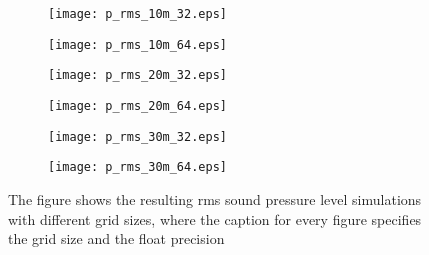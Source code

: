 \begin{figure}[H]
\begin{subfigure}[c]{0.46\textwidth}
\texttt{[image: p\_rms\_10m\_32.eps]}
\label{fig:p_rms_10m_32}
\vspace{5mm}
\end{subfigure}
\hfill
\begin{subfigure}[c]{0.46\textwidth}
\texttt{[image: p\_rms\_10m\_64.eps]}
\label{fig:p_rms_10m_64}
\vspace{5mm}
\end{subfigure}
\begin{subfigure}[c]{0.46\textwidth}
\texttt{[image: p\_rms\_20m\_32.eps]}
\label{fig:p_rms_20m_32}
\vspace{5mm}
\end{subfigure}
\hfill
\begin{subfigure}[c]{0.46\textwidth}
\texttt{[image: p\_rms\_20m\_64.eps]}
\label{fig:p_rms_20m_64}
\vspace{5mm}
\end{subfigure}
\begin{subfigure}[c]{0.46\textwidth}
\texttt{[image: p\_rms\_30m\_32.eps]}
\label{fig:p_rms_30m_32}
\vspace{5mm}
\end{subfigure}
\hfill
\begin{subfigure}[c]{0.46\textwidth}
\texttt{[image: p\_rms\_30m\_64.eps]}
\label{fig:p_rms_30m_64}
\vspace{5mm}
\end{subfigure}
\caption{The figure shows the resulting \gls{rms} sound pressure level simulations with different grid sizes, where the caption for every figure specifies the grid size and the float precision}
		\label{fig:p_rms}
\end{figure}


